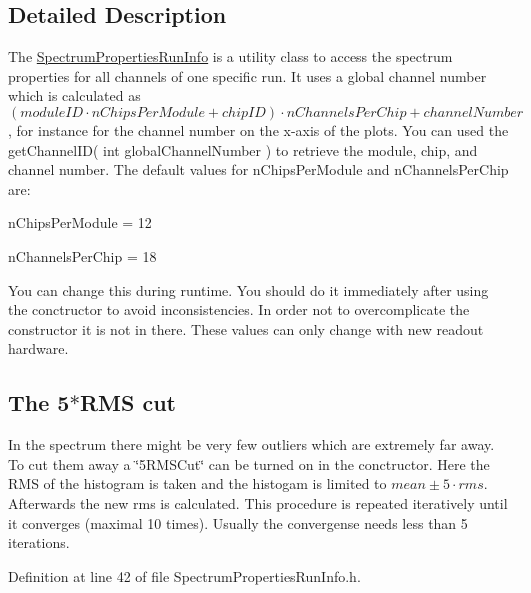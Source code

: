 \subsection{Detailed Description}
The \hyperlink{class_spectrum_properties_run_info}{SpectrumPropertiesRunInfo} is a utility class to access the spectrum properties for all channels of one specific run. It uses a global channel number which is calculated as $( moduleID \cdot nChipsPerModule + chipID ) \cdot nChannelsPerChip + channelNumber $, for instance for the channel number on the x-\/axis of the plots. You can used the getChannelID( int globalChannelNumber ) to retrieve the module, chip, and channel number. The default values for {\ttfamily nChipsPerModule} and {\ttfamily nChannelsPerChip} are: \begin{DoxyItemize}
\item {\ttfamily nChipsPerModule} = 12 \item {\ttfamily nChannelsPerChip} = 18\end{DoxyItemize}
You can change this during runtime. You should do it immediately after using the conctructor to avoid inconsistencies. In order not to overcomplicate the constructor it is not in there. These values can only change with new readout hardware.\hypertarget{class_spectrum_properties_run_info_FiveRMSCut}{}\subsection{The 5$\ast$RMS cut}\label{class_spectrum_properties_run_info_FiveRMSCut}
In the spectrum there might be very few outliers which are extremely far away. To cut them away a \char`\"{}5RMSCut\char`\"{} can be turned on in the conctructor. Here the RMS of the histogram is taken and the histogam is limited to $mean \pm 5\cdot rms$. Afterwards the new rms is calculated. This procedure is repeated iteratively until it converges (maximal 10 times). Usually the convergense needs less than 5 iterations. 

Definition at line 42 of file SpectrumPropertiesRunInfo.h.

